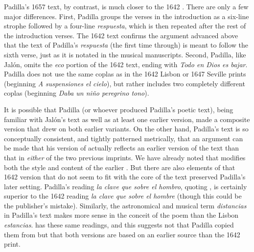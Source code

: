 Padilla's 1657 text, by contrast, is much closer to the 1642 .
There are only a few major differences.
First, Padilla groups the verses in the introduction as a six-line strophe
followed by a four-line \emph{respuesta}, which is then repeated after the rest
of the introduction verses. 
The 1642 text confirms the argument advanced above that the text of Padilla's
\emph{respuesta} (the first time through) is meant to follow the sixth verse,
just as it is notated in the musical manuscripts.
Second, Padilla, like Jalón, omits the \emph{eco} portion of the 1642 text,
ending with \emph{Todo en Dios es bajar}.
Padilla does not use the same coplas as in the 1642 Lisbon or 1647 Seville
prints (beginning \emph{A suspensiones el cielo}), but rather includes two
completely different coplas (beginning \emph{Daba un niño peregrino tono}).

It is possible that Padilla (or whoever produced Padilla's poetic text), being
familiar with Jalón's text as well as at least one earlier version, made a
composite version that drew on both earlier variants.
On the other hand, Padilla's text is so conceptually consistent, and tightly
patterned metrically, that an argument can be made that his version of
 actually reflects an earlier version of the text than that in
\emph{either} of the two previous imprints.
We have already noted that  modifies both the style and content
of the earlier .
But there are also elements of that 1642 version that do not seem to fit with
the core of the text preserved Padilla's later setting.
Padilla's reading \emph{la clave que sobre el hombro}, quoting
, is certainly superior to the 1642 reading \emph{la clave
que sobre el hombre} (though this could be the publisher's mistake).
Similarly, the astronomical and musical term \emph{distancias} in Padilla's text
makes more sense in the conceit of the poem than the Lisbon \emph{estancias}.
 has these same readings, and this suggests not that Padilla
copied them from  but that both versions are based on an
earlier source than the 1642 print.

